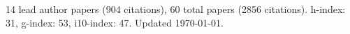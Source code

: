 14 lead author papers (904 citations),
60 total papers (2856 citations).\newline
h-index: 31, g-index: 53, i10-index: 47. Updated \today.